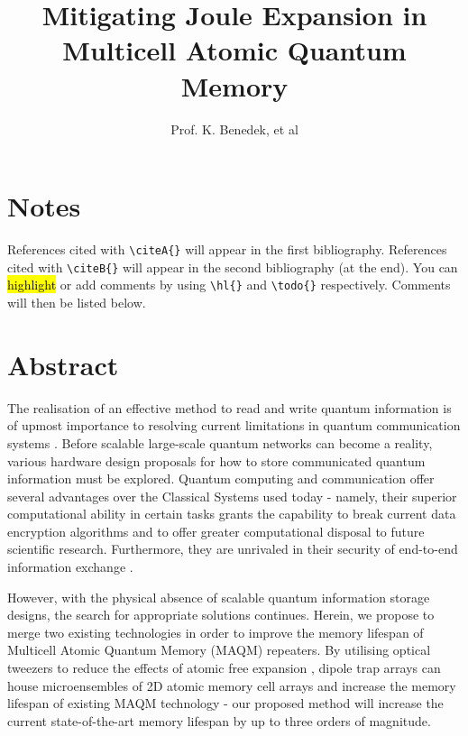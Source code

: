 \documentclass{epsrc}
\begin{document}
\section{Notes}
References cited with \verb|\citeA{}| will appear in the first bibliography. 
References cited with \verb|\citeB{}| will appear in the second bibliography (at the end).
You can \hl{highlight} or add comments  by using \verb|\hl{}| and \verb|\todo{}| respectively.
Comments will then be listed below.


\listoftodos%
\newpage%
\title{Mitigating Joule Expansion in Multicell Atomic Quantum Memory}
\author{Prof. K. Benedek, et al}
\maketitle

\section{Abstract}

The realisation of an effective method to read and write quantum information is of upmost importance to resolving current limitations in quantum communication systems . Before scalable large-scale quantum networks can become a reality, various hardware design proposals for how to store communicated quantum information must be explored. Quantum computing and communication offer several advantages over the Classical Systems used today - namely, their superior computational ability in certain tasks grants the capability to break current data encryption algorithms  and to offer greater computational disposal to future scientific research. Furthermore, they are unrivaled in their security of end-to-end information exchange . 

However, with the physical absence of scalable quantum information storage designs, the search for appropriate solutions continues. Herein, we propose to merge two existing technologies in order to improve the memory lifespan of Multicell Atomic Quantum Memory (MAQM) repeaters. By utilising optical tweezers to reduce the effects of atomic free expansion , dipole trap arrays can house microensembles of 2D atomic memory cell arrays and increase the memory lifespan of existing MAQM technology  - our proposed method will increase the current state-of-the-art memory lifespan by up to three orders of magnitude. 
\end{document}
